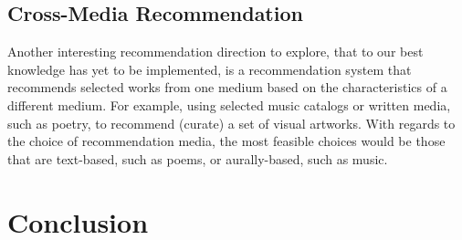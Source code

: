 \documentclass[fontsize=12pt]{scrartcl} %
\begin{document}
\subsection{Cross-Media Recommendation}
Another interesting recommendation direction to explore, that to our best knowledge has yet to be implemented, is a recommendation system that recommends selected works from one medium based on the characteristics of a different medium. For example, using selected music catalogs or written media, such as poetry, to recommend (curate) a set of visual artworks. With regards to the choice of recommendation media, the most feasible choices would be those that are text-based, such as poems, or aurally-based, such as music.

\section{Conclusion}
\end{document}
